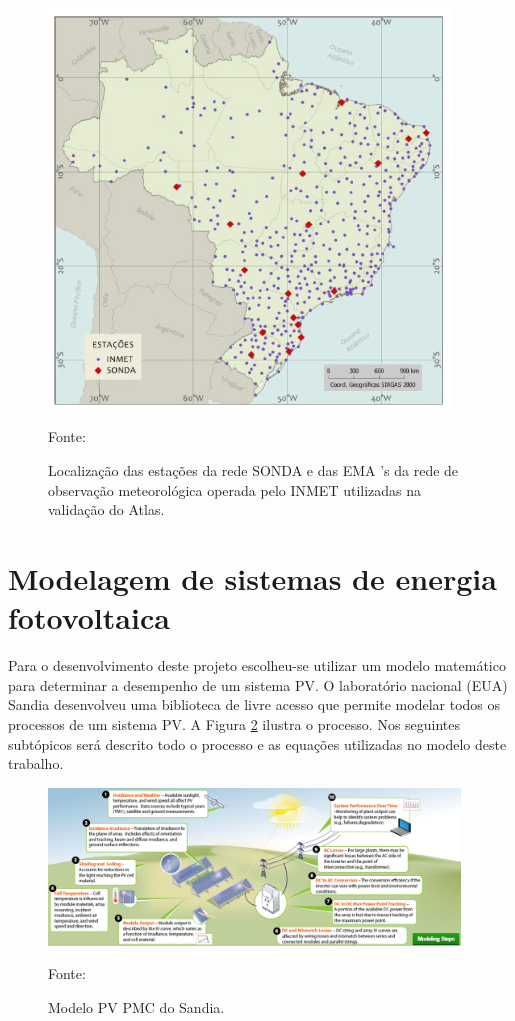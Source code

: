 \begin{figure}[H]
    \centering
    \includegraphics[width=0.95\textwidth]{./Figuras/etacoes_inmet.png}
    \caption{Localização das estações da rede SONDA e das EMA 's da rede de observação meteorológica operada pelo INMET utilizadas na validação do Atlas.}{Fonte: \cite{atlas2017}}
   \label{fig:etacoes_inmet}
\end{figure}

\section{Modelagem de sistemas de energia fotovoltaica}\label{modelo_sadia}

Para o desenvolvimento deste projeto escolheu-se utilizar um modelo matemático para determinar a desempenho de um sistema PV. O laboratório nacional (EUA) Sandia desenvolveu uma biblioteca de livre acesso que permite modelar todos os processos de um sistema PV. A Figura \ref{fig:sandia_model} ilustra o processo. Nos seguintes subtópicos será descrito todo o processo e as equações utilizadas no modelo deste trabalho.

\begin{figure}[H]
    \centering
    \includegraphics[width=0.975\textwidth]{./Figuras/sandia_model.png}
    \caption{Modelo PV PMC do Sandia.}{Fonte: \cite{sandia}}
   \label{fig:sandia_model}
\end{figure}

